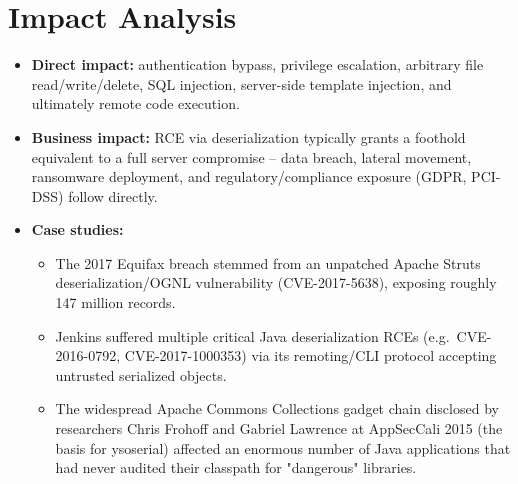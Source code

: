 \documentclass[11pt]{article}
\begin{document}
\section{Impact Analysis}
\begin{itemize}
    \item \textbf{Direct impact:} authentication bypass, privilege escalation, arbitrary file read/write/delete, SQL injection, server-side template injection, and ultimately remote code execution.
    \item \textbf{Business impact:} RCE via deserialization typically grants a foothold equivalent to a full server compromise -- data breach, lateral movement, ransomware deployment, and regulatory/compliance exposure (GDPR, PCI-DSS) follow directly.
    \item \textbf{Case studies:}
    \begin{itemize}
        \item The 2017 Equifax breach stemmed from an unpatched Apache Struts deserialization/OGNL vulnerability (CVE-2017-5638), exposing roughly 147 million records.
        \item Jenkins suffered multiple critical Java deserialization RCEs (e.g.\ CVE-2016-0792, CVE-2017-1000353) via its remoting/CLI protocol accepting untrusted serialized objects.
        \item The widespread Apache Commons Collections gadget chain disclosed by researchers Chris Frohoff and Gabriel Lawrence at AppSecCali 2015 (the basis for ysoserial) affected an enormous number of Java applications that had never audited their classpath for "dangerous" libraries.
    \end{itemize}
\end{itemize}

\end{document}
